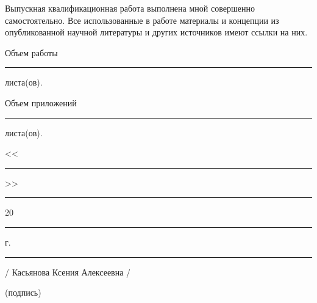 \documentclass[12pt,a4paper, oneside]{extreport}
\begin{document}
\newpage
\thispagestyle{empty}

Выпускная квалификационная работа выполнена мной совершенно самостоятельно. Все использованные в работе материалы и концепции из опубликованной научной литературы и других источников имеют ссылки на них.

\vspace{2ex}

 Объем работы  \rule{2em}{0.5pt} листа(ов).

\vspace{2ex}

 Объем приложений \rule{2em}{0.5pt} листа(ов).

\vspace{4ex}

\noindent << \rule{1em}{0.5pt} >> \rule{5em}{0.5pt} 20 \rule{1.4em}{0.5pt} г. 

\vspace{4ex}



\noindent \rule{11em}{0.5pt} 
\hspace{8em} / Касьянова Ксения Алексеевна /

\hspace{5ex} \footnotesize (подпись)


\end{document}
